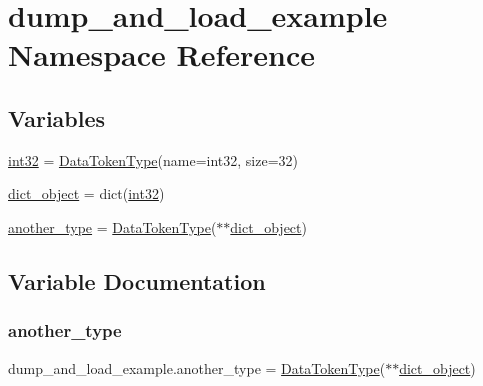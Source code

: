 \hypertarget{namespacedump__and__load__example}{}\section{dump\+\_\+and\+\_\+load\+\_\+example Namespace Reference}
\label{namespacedump__and__load__example}
\subsection*{Variables}
\begin{DoxyCompactItemize}
\item 
\hyperlink{namespacedump__and__load__example_ab4af7f95fadf43e2c2e1226297d1da8b}{int32} = \hyperlink{classsylva_1_1base_1_1sdf_1_1_data_token_type}{Data\+Token\+Type}(name=\textquotesingle{}int32\textquotesingle{}, size=32)
\item 
\hyperlink{namespacedump__and__load__example_a0e5d16dccda2cfc0eaf7eefb4d1db609}{dict\+\_\+object} = dict(\hyperlink{namespacedump__and__load__example_ab4af7f95fadf43e2c2e1226297d1da8b}{int32})
\item 
\hyperlink{namespacedump__and__load__example_a8717dae788d274043cc58fd3573202f7}{another\+\_\+type} = \hyperlink{classsylva_1_1base_1_1sdf_1_1_data_token_type}{Data\+Token\+Type}($\ast$$\ast$\hyperlink{namespacedump__and__load__example_a0e5d16dccda2cfc0eaf7eefb4d1db609}{dict\+\_\+object})
\end{DoxyCompactItemize}


\subsection{Variable Documentation}
\mbox{\label{namespacedump__and__load__example_a8717dae788d274043cc58fd3573202f7}} 
\subsubsection{\texorpdfstring{another\+\_\+type}{another\_type}}
{\footnotesize\ttfamily dump\+\_\+and\+\_\+load\+\_\+example.\+another\+\_\+type = \hyperlink{classsylva_1_1base_1_1sdf_1_1_data_token_type}{Data\+Token\+Type}($\ast$$\ast$\hyperlink{namespacedump__and__load__example_a0e5d16dccda2cfc0eaf7eefb4d1db609}{dict\+\_\+object})}



